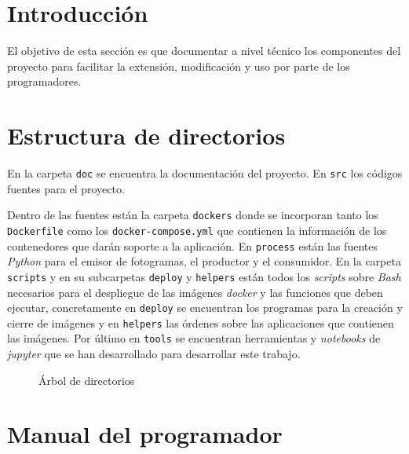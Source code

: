 
\section{Introducción}

El objetivo de esta sección es que documentar a nivel técnico los componentes del proyecto para facilitar la extensión, modificación y uso por parte de los programadores.

\section{Estructura de directorios}

En la carpeta \texttt{doc} se encuentra la documentación del proyecto. En \texttt{src} los códigos fuentes para el proyecto.

Dentro de las fuentes están la carpeta \texttt{dockers} donde se incorporan tanto los \texttt{Dockerfile} como los \texttt{docker-compose.yml} que contienen la información de los contenedores que darán soporte a la aplicación. En \texttt{process} están las fuentes \textit{Python} para el emisor de fotogramas, el productor y el consumidor. En la carpeta \texttt{scripts} y en su subcarpetas \texttt{deploy} y \texttt{helpers} están todos los \textit{scripts} sobre \textit{Bash} necesarios para el despliegue de las imágenes \textit{docker} y las funciones que deben ejecutar, concretamente en \texttt{deploy} se encuentran los programas para la creación y cierre de imágenes y en \texttt{helpers} las órdenes sobre las aplicaciones que contienen las imágenes. Por último en \texttt{tools} se encuentran herramientas y \textit{notebooks} de \textit{jupyter} que se han desarrollado para desarrollar este trabajo.

\begin{figure}
	\caption{Árbol de directorios}
	\label{fig:dirtree}
\end{figure}

\section{Manual del programador}\label{sec:manualpro}

